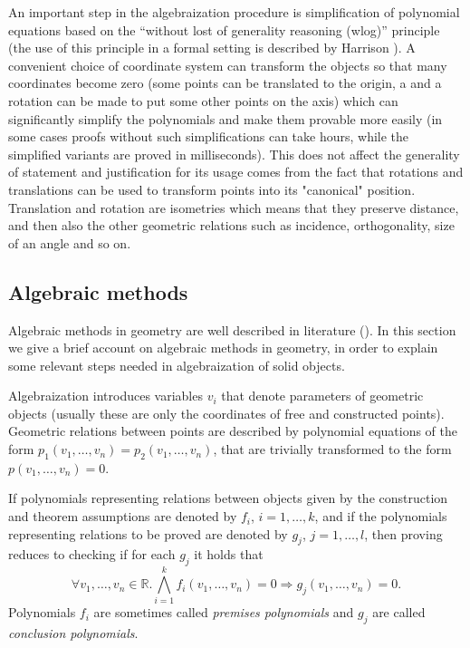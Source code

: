 \documentclass[final,1p,times,authoryear]{elsarticle}
\begin{document}
An important step in the algebraization procedure is simplification of
polynomial equations based on the ``without lost of generality
reasoning (wlog)'' principle (the use of this principle in a formal
setting is described by Harrison \cite{harrison}). A convenient choice
of coordinate system can transform the objects so that many
coordinates become zero (some points can be translated to the origin,
a and a rotation can be made to put some other points on the axis)
which can significantly simplify the polynomials and make them
provable more easily (in some cases proofs without such
simplifications can take hours, while the simplified variants are
proved in milliseconds). This does not affect the generality of
statement and justification for its usage comes from the fact that
rotations and translations can be used to transform points into its
"canonical" position. Translation and rotation are isometries which
means that they preserve distance, and then also the other geometric
relations such as incidence, orthogonality, size of an angle and so
on.

\subsection{Algebraic methods}

Algebraic methods in geometry are well described in literature
(\cite{wu, buchberger}). In this section we give a brief account on
algebraic methods in geometry, in order to explain some relevant steps
needed in algebraization of solid objects.

Algebraization introduces variables $v_i$ that denote parameters of
geometric objects (usually these are only the coordinates of free and
constructed points). Geometric relations between points are described
by polynomial equations of the form
$p_1(v_1, \ldots, v_n) = p_2(v_1, \ldots, v_n)$, that are trivially
transformed to the form $p(v_1, \ldots, v_n) = 0$.

If polynomials representing relations between objects given by the
construction and theorem assumptions are denoted by $f_i$, $i = 1,
\ldots, k$, and if the polynomials representing relations to be proved
are denoted by $g_j$, $j = 1, \ldots, l$, then proving reduces to
checking if for each $g_j$ it holds that
$$\forall v_1, \ldots, v_n \in \mathbb{R}. \bigwedge_{i = 1}^{k}
f_i(v_1, \ldots, v_n) = 0 \Longrightarrow g_j(v_1, \ldots, v_n) = 0.$$
Polynomials $f_i$ are sometimes called \emph{premises polynomials} and
$g_j$ are called \emph{conclusion polynomials}.
\end{document}
